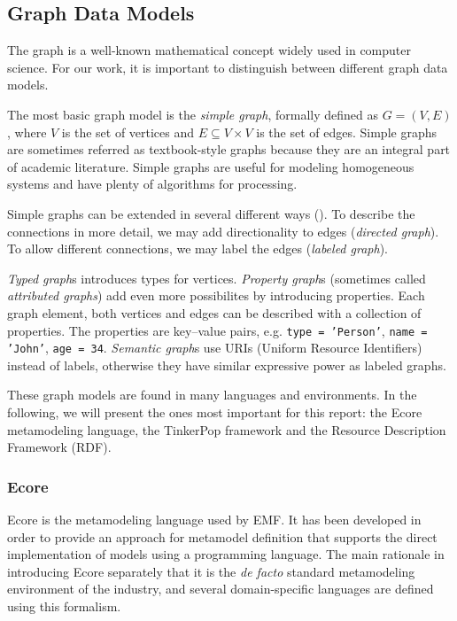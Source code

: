 \subsection{Graph Data Models}

The graph is a well-known mathematical concept widely used in computer science. For our work, it is important to distinguish between different graph data models.


The most basic graph model is the \emph{simple graph}, formally defined as $G = (V, E)$, where $V$ is the set of vertices and $E \subseteq V \times V$ is the set of edges. Simple graphs are sometimes referred as textbook-style graphs because they are an integral part of academic literature. Simple graphs are useful for modeling homogeneous systems and have plenty of algorithms for processing.

Simple graphs can be extended in several different ways (). To describe the connections in more detail, we may add directionality to edges (\emph{directed graph}). To allow different connections, we may label the edges (\emph{labeled graph}). 

\emph{Typed graph}s introduces types for vertices. \emph{Property graph}s (sometimes called \emph{attributed graphs}) add even more possibilites by introducing properties. Each graph element, both vertices and edges can be described with a collection of properties. The properties are key--value pairs, e.g. \texttt{type = 'Person'}, \texttt{name = 'John'}, \texttt{age = 34}. \emph{Semantic graph}s use URIs (Uniform Resource Identifiers) instead of labels, otherwise they have similar expressive power as labeled graphs. 


These graph models are found in many languages and environments. In the following, we will present the ones most important for this report: the Ecore metamodeling language, the TinkerPop framework and the Resource Description Framework (RDF).   

\subsubsection{Ecore}
\label{ecore}

Ecore is the metamodeling language used by EMF. It has been developed in order to provide an approach for metamodel definition that supports the direct implementation of models using a programming language. The main rationale in introducing Ecore separately that it is the \emph{de facto} standard metamodeling environment of the industry, and several domain-specific languages are defined using this formalism.

